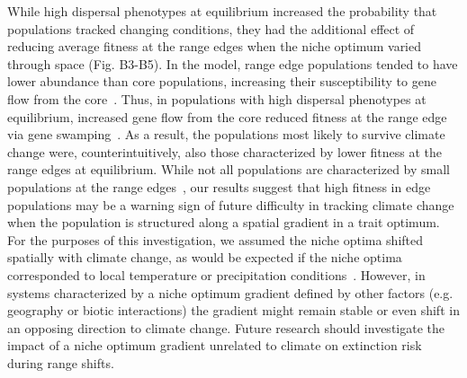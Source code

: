 \documentclass[11pt]{article}
\begin{document}
While high dispersal phenotypes at equilibrium increased the probability that populations tracked changing conditions, they had the additional effect of reducing average fitness at the range edges when the niche optimum varied through space (Fig. B3-B5). In the model, range edge populations tended to have lower abundance than core populations, increasing their susceptibility to gene flow from the core~\citep{kirkpatrick1997evolution, garcia1997genetic}. Thus, in populations with high dispersal phenotypes at equilibrium, increased gene flow from the core reduced fitness at the range edge via gene swamping~\citep{lenormand2002gene}. As a result, the populations most likely to survive climate change were, counterintuitively, also those characterized by lower fitness at the range edges at equilibrium. While not all populations are characterized by small populations at the range edges~\citep{dallas2017species}, our results suggest that high fitness in edge populations may be a warning sign of future difficulty in tracking climate change when the population is structured along a spatial gradient in a trait optimum. For the purposes of this investigation, we assumed the niche optima shifted spatially with climate change, as would be expected if the niche optima corresponded to local temperature or precipitation conditions~\citep{davis2001range}. However, in systems characterized by a niche optimum gradient defined by other factors (e.g. geography or biotic interactions) the gradient might remain stable or even shift in an opposing direction to climate change. Future research should investigate the impact of a niche optimum gradient unrelated to climate on extinction risk during range shifts.
\end{document}
